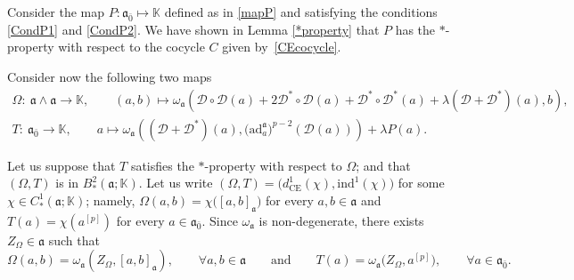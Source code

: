 \documentclass[10pt,a4paper]{amsart}
\numberwithin{equation}{section}
\begin{document}
Consider the map $ P\colon\mathfrak{a}_{\bar 0} \mapsto \mathbb{K} $ defined as in \eqref{mapP} and
satisfying the conditions \eqref{CondP1} and \eqref{CondP2}. We have shown in Lemma \ref{*property} that $P$ has the $*$-property with respect to the cocycle $C$ given by~\eqref{CEcocycle}.

Consider now the following two
maps
\begin{gather*}
\Omega\colon\ \mathfrak{a}\wedge \mathfrak{a} \rightarrow \mathbb K, \qquad (a,b) \mapsto \omega_\mathfrak{a}( {\mathscr D} \circ {\mathscr D}(a) + 2 {\mathscr D}^* \circ {\mathscr D}(a)+ {\mathscr D}^* \circ {\mathscr D}^*(a) +\lambda ( {\mathscr D} + {\mathscr D} ^* )(a) , b) , \\
T\colon\ \mathfrak{a}_{\bar 0} \rightarrow \mathbb K, \qquad a \mapsto \omega_\mathfrak{a}(({\mathscr D}+{\mathscr D}^*)(a),\bigl(\mathrm{ad}_a^\mathfrak{a}\bigr)^{p-2}({\mathscr D}(a)))+\lambda P(a).
\end{gather*}

Let us suppose that $T$ satisfies the $*$-property with respect to $\Omega$; and that $(\Omega, T)$ is in $B^2_*(\mathfrak{a};\mathbb{K})$.
Let us write $(\Omega, T)= \bigl(d^1_{\mathrm{CE}} (\chi), \mathrm{ind}^1(\chi) \bigr)$ for some $\chi\in C^1_*(\mathfrak{a}; \mathbb{K})$; namely, $\Omega(a,b)=\chi\bigl([a,b]_\mathfrak{a}\bigr)$ for every $a,b\in \mathfrak{a}$ and $T(a)=\chi(a^{[p]})$ for every $a\in \mathfrak{a}_{\bar 0}$.
 Since $\omega_\mathfrak{a}$ is non-degenerate, there exists~$Z_\Omega\in \mathfrak{a}$ such that
\begin{equation}
\label{Eazero}
\Omega(a,b)=\omega_\mathfrak{a}(Z_\Omega,[a,b]_\mathfrak{a}),\qquad \forall a,b\in \mathfrak{a} \qquad \text{and} \qquad T(a)=\omega_\mathfrak{a}\bigl(Z_\Omega,a^{[p]}\bigr), \qquad \forall a\in \mathfrak{a}_{\bar 0}.
\end{equation}
\end{document}
